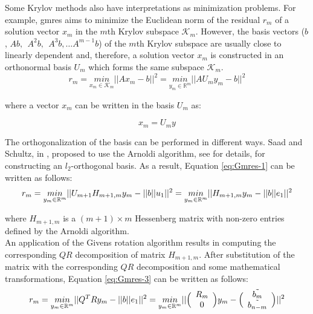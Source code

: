 Some Krylov methods also have interpretations as minimization problems. For example, \acrshort{gmres} aims to minimize the Euclidean norm of the residual $r_{m}$ of a solution vector $x_{m}$ in the $m$th Krylov subspace $\mathcal{K}_{m}$. However, the basis vectors ($b$, $Ab, \:\: A^2b, \:\: A^3b, \dots A^{m-1}b$) of the $m$th Krylov subspace  are usually close to linearly dependent and, therefore, a solution vector $x_{m}$ is constructed in an orthonormal basis $U_{m}$ which forms the same subspace $\mathcal{K}_{m}$.\\


\begin{equation} \label{eq:Gmres-1}
	r_{m} = \underset{x_m \in \mathcal{K}_{m}}{min}||Ax_{m} - b||^2 =  \underset{y_m \in \mathbb{R}^m}{min}||AU_m y_{m} - b||^2
\end{equation}

where a vector $x_m$ can be written in the basis $U_m$ as:

\begin{equation} \label{eq:Gmres-2}
		x_m = U_{m} y
\end{equation}

The orthogonalization of the basis can be performed in different ways. Saad and Schultz, in \cite{sparse-la:gmrese-origin}, proposed to use the Arnoldi algorithm, see \cite{krylov:arnoldi-prcess} for details, for constructing an $l_2$-orthogonal basis. As a result, Equation \ref{eq:Gmres-1} can be written as follows:  \\

\begin{equation} \label{eq:Gmres-3}
	r_{m} = \underset{y_m \in \mathbb{R}^m}{min}||U_{m+1}H_{m+1,m} y_{m} - ||b||u_1||^2 = \\
	\underset{y_m \in \mathbb{R}^m}{min}||H_{m+1,m} y_{m} - ||b||e_1||^2 
\end{equation}

where $H_{m+1,m}$ is a $(m+1) \times m$ Hessenberg matrix with non-zero entries defined by the Arnoldi algorithm.\\

An application of the Givens rotation algorithm results in computing the corresponding $QR$ decomposition of matrix $H_{m+1,m}$. After substitution of the matrix with the corresponding $QR$ decomposition and some mathematical transformations, Equation \ref{eq:Gmres-3} can be written as follows:\\

 
\begin{equation} \label{eq:Gmres-4}
	r_{m} = \\
	\underset{y_m \in \mathbb{R}^m}{min}||Q^{T}Ry_{m} - ||b||e_{1}||^2 = \\
	\underset{y_m \in \mathbb{R}^m}{min}||\Big(\begin{array}{c c}R_m \\ 0 \\\end{array}\Big) y_{m} - \Big(\begin{array}{c c} \tilde{b_m} \\ \tilde{b_{n-m}} \\\end{array}\Big)||^2
\end{equation}

